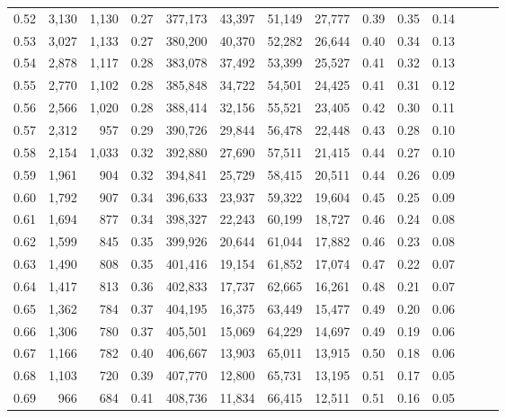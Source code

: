 \begin{tabular}{rrrrrrrrrrrrrr}
0.52 &   3,130 &  1,130 &  0.27 &  377,173 &   43,397 &  51,149 &  27,777 &  0.39 &  0.35 &      0.14 \\
0.53 &   3,027 &  1,133 &  0.27 &  380,200 &   40,370 &  52,282 &  26,644 &  0.40 &  0.34 &      0.13 \\
0.54 &   2,878 &  1,117 &  0.28 &  383,078 &   37,492 &  53,399 &  25,527 &  0.41 &  0.32 &      0.13 \\
0.55 &   2,770 &  1,102 &  0.28 &  385,848 &   34,722 &  54,501 &  24,425 &  0.41 &  0.31 &      0.12 \\
0.56 &   2,566 &  1,020 &  0.28 &  388,414 &   32,156 &  55,521 &  23,405 &  0.42 &  0.30 &      0.11 \\
0.57 &   2,312 &    957 &  0.29 &  390,726 &   29,844 &  56,478 &  22,448 &  0.43 &  0.28 &      0.10 \\
0.58 &   2,154 &  1,033 &  0.32 &  392,880 &   27,690 &  57,511 &  21,415 &  0.44 &  0.27 &      0.10 \\
0.59 &   1,961 &    904 &  0.32 &  394,841 &   25,729 &  58,415 &  20,511 &  0.44 &  0.26 &      0.09 \\
0.60 &   1,792 &    907 &  0.34 &  396,633 &   23,937 &  59,322 &  19,604 &  0.45 &  0.25 &      0.09 \\
0.61 &   1,694 &    877 &  0.34 &  398,327 &   22,243 &  60,199 &  18,727 &  0.46 &  0.24 &      0.08 \\
0.62 &   1,599 &    845 &  0.35 &  399,926 &   20,644 &  61,044 &  17,882 &  0.46 &  0.23 &      0.08 \\
0.63 &   1,490 &    808 &  0.35 &  401,416 &   19,154 &  61,852 &  17,074 &  0.47 &  0.22 &      0.07 \\
0.64 &   1,417 &    813 &  0.36 &  402,833 &   17,737 &  62,665 &  16,261 &  0.48 &  0.21 &      0.07 \\
0.65 &   1,362 &    784 &  0.37 &  404,195 &   16,375 &  63,449 &  15,477 &  0.49 &  0.20 &      0.06 \\
0.66 &   1,306 &    780 &  0.37 &  405,501 &   15,069 &  64,229 &  14,697 &  0.49 &  0.19 &      0.06 \\
0.67 &   1,166 &    782 &  0.40 &  406,667 &   13,903 &  65,011 &  13,915 &  0.50 &  0.18 &      0.06 \\
0.68 &   1,103 &    720 &  0.39 &  407,770 &   12,800 &  65,731 &  13,195 &  0.51 &  0.17 &      0.05 \\
0.69 &     966 &    684 &  0.41 &  408,736 &   11,834 &  66,415 &  12,511 &  0.51 &  0.16 &      0.05 \\

\end{tabular}

